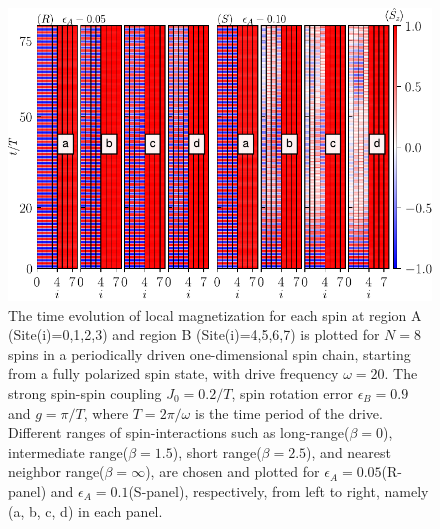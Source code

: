 \documentclass[12pt]{iopart}
\begin{document}
\begin{figure}[t!]
\centering
\hspace{1.5cm}\includegraphics[width=13.5cm]{figure6.pdf}
\caption{The time evolution of local magnetization for each spin at region A (Site(i)=0,1,2,3) and region B (Site(i)=4,5,6,7) is plotted for $N=8$ spins in a periodically driven one-dimensional spin chain, starting from a fully polarized spin state, with drive frequency $\omega=20$. The strong spin-spin coupling $J_0 = 0.2/T$, spin rotation error $\epsilon_B = 0.9$ and $g=\pi/T$, where $T=2\pi/\omega$ is the time period of the drive.  Different ranges of spin-interactions such as long-range($\beta=0$), intermediate range($\beta=1.5$), short range($\beta=2.5$), and nearest neighbor range($\beta=\infty$), are chosen and plotted  for $\epsilon_A =0.05$(R-panel) and $\epsilon_A =0.1$(S-panel), respectively, from left to right, namely (a, b, c, d) in each panel.}
\label{Fig:ea}
\end{figure}
\end{document}
